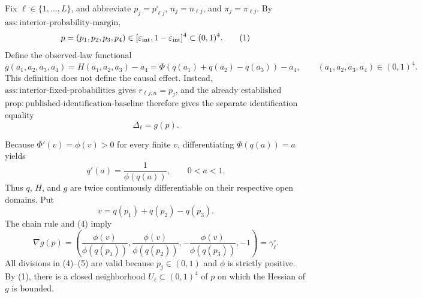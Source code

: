 Fix \(\ell\in\{1,\ldots,L\}\), and abbreviate \(p_j=p^{\circ}_{\ell j}\), \(n_j=n_{\ell j}\), and \(\pi_j=\pi_{\ell j}\). By \(\mathrm{ass:interior\mbox{-}probability\mbox{-}margin}\),
\[
 p=(p_1,p_2,p_3,p_4)\in[\varepsilon_{\rm int},1-\varepsilon_{\rm int}]^4\subset(0,1)^4.
\tag{1}
\]
Define the observed-law functional
\[
 g(a_1,a_2,a_3,a_4)=H(a_1,a_2,a_3)-a_4
 =\Phi\!\left(q(a_1)+q(a_2)-q(a_3)\right)-a_4,
 \qquad (a_1,a_2,a_3,a_4)\in(0,1)^4.
\tag{2}
\]
This definition does not define the causal effect. Instead, \(\mathrm{ass:interior\mbox{-}fixed\mbox{-}probabilities}\) gives \(r_{\ell j,n}=p_j\), and the already established \(\mathrm{prop:published\mbox{-}identification\mbox{-}baseline}\) therefore gives the separate identification equality
\[
 \Delta_\ell=g(p).
\tag{3}
\]

Because \(\Phi'(v)=\phi(v)>0\) for every finite \(v\), differentiating \(\Phi(q(a))=a\) yields
\[
 q'(a)=\frac{1}{\phi(q(a))},\qquad 0<a<1.
\tag{4}
\]
Thus \(q\), \(H\), and \(g\) are twice continuously differentiable on their respective open domains. Put
\[
 v=q(p_1)+q(p_2)-q(p_3).
\]
The chain rule and (4) imply
\[
 \nabla g(p)=\left(
 \frac{\phi(v)}{\phi(q(p_1))},
 \frac{\phi(v)}{\phi(q(p_2))},
 -\frac{\phi(v)}{\phi(q(p_3))},
 -1\right)=\gamma^{\circ}_{\ell}.
\tag{5}
\]
All divisions in (4)--(5) are valid because \(p_j\in(0,1)\) and \(\phi\) is strictly positive. By (1), there is a closed neighborhood \(U_\ell\subset(0,1)^4\) of \(p\) on which the Hessian of \(g\) is bounded.

